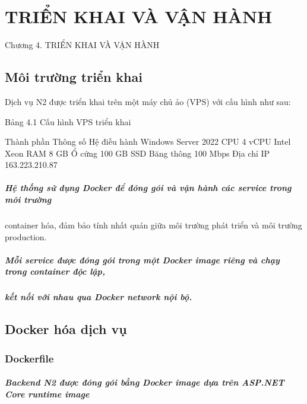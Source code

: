 \chapter{TRIỂN KHAI VÀ VẬN HÀNH}

Chương 4. TRIỂN KHAI VÀ VẬN HÀNH

\section{Môi trường triển khai}

Dịch vụ N2 được triển khai trên một máy chủ ảo (VPS) với cấu hình như sau:

Bảng 4.1 Cấu hình VPS triển khai

Thành phần Thông số Hệ điều hành Windows Server 2022 CPU 4 vCPU Intel Xeon RAM 8 GB Ổ cứng 100 GB SSD Băng thông 100 Mbps Địa chỉ IP 163.223.210.87

\paragraph{Hệ thống sử dụng Docker để đóng gói và vận hành các service trong môi trường}

container hóa, đảm bảo tính nhất quán giữa môi trường phát triển và môi trường production.

\paragraph{Mỗi service được đóng gói trong một Docker image riêng và chạy trong container độc lập,}

\paragraph{kết nối với nhau qua Docker network nội bộ.}

\section{Docker hóa dịch vụ}

\subsection{Dockerfile}

\paragraph{Backend N2 được đóng gói bằng Docker image dựa trên ASP.NET Core runtime image}

